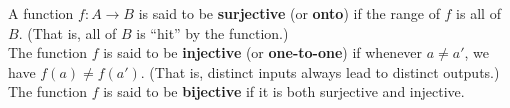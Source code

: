 \documentclass[10pt]{beamer}
\begin{document}
\begin{frame}

\footnotesize 
\begin{mygreenbox}[title=Definitions (Hampkins pp. 128)]
A function $f : A \to B$ is said to be  \textbf{surjective} (or \textbf{onto}) if the range of $f$ is all of $B$.  (That is, all of $B$ is \enquote{hit} by the function.)\\
\vfill 
The function $f$  is said to be  \textbf{injective} (or \textbf{one-to-one}) if whenever $a \neq a'$, we have $f(a) \neq f(a')$.  (That is, distinct inputs always lead to distinct outputs.) \\
\vfill The function $f$ is said to be \textbf{bijective} if it is both surjective and injective.	
\end{mygreenbox}
 
\vfill 


\end{frame}
\end{document}
